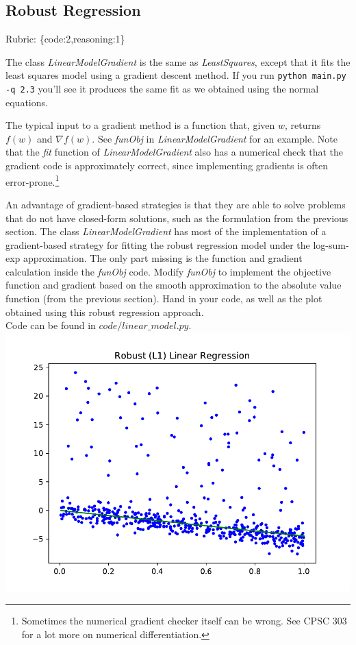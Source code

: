 \documentclass{article}
\def\rubric#1{\gre{Rubric: \{#1\}}}{}
\def\blu#1{{\color{blu}#1}}
\def\gre#1{{\color{gre}#1}}
\begin{document}
\subsection{Robust Regression}
\rubric{code:2,reasoning:1}

The class \emph{LinearModelGradient} is the same as \emph{LeastSquares}, except that it fits the least squares model using a gradient descent method. If you run \verb|python main.py -q 2.3| you'll see it produces the same fit as we obtained using the normal equations.

The typical input to a gradient method is a function that, given $w$, returns $f(w)$ and $\nabla f(w)$. See \emph{funObj} in \emph{LinearModelGradient} for an example. Note that the \emph{fit} function of \emph{LinearModelGradient} also has a numerical check that the gradient code is approximately correct, since implementing gradients is often error-prone.\footnote{Sometimes the numerical gradient checker itself can be wrong. See CPSC 303 for a lot more on numerical differentiation.}

An advantage of gradient-based strategies is that they are able to solve
problems that do not have closed-form solutions, such as the formulation from the
previous section. The class \emph{LinearModelGradient} has most of the implementation
of a gradient-based strategy for fitting the robust regression model under the log-sum-exp approximation.
The only part missing is the function and gradient calculation inside the \emph{funObj} code.
\blu{Modify \emph{funObj} to implement the objective function and gradient based on the smooth
approximation to the absolute value function (from the previous section). Hand in your code, as well
as the plot obtained using this robust regression approach.}
\\
Code can be found in $code/linear\_model.py$.
\\ \includegraphics{../figs/least_squares_robust.pdf}
\end{document}

